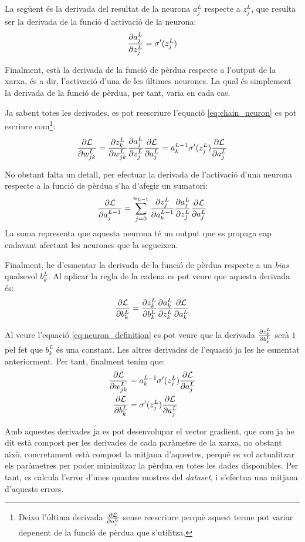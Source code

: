 La següent és la derivada del resultat de la neurona $a_j^L$ respecte a $z_j^L$, que resulta ser la derivada de la funció d'activació de la neurona:
\begin{equation*}
	\pdv{a_j^L}{z_j^L} = \sigma'(z_j^L)
\end{equation*}

Finalment, està la derivada de la funció de pèrdua respecte a l'output de la xarxa, és a dir, l'activació d'una de les últimes neurones. La qual és simplement la derivada de la funció de pèrdua, per tant, varia en cada cas.

Ja sabent totes les derivades, es pot reescriure l'equació \ref{eq:chain_neuron} es pot escriure com\footnote{Deixo l'última derivada $\pdv{\mathcal{L}}{a_j^L}$ sense reescriure perquè aquest terme pot variar depenent de la funció de pèrdua que s'utilitza.}:
$$
	\pdv{\mathcal{L}}{w_{jk}^L} = \pdv{z_k^L}{w_{jk}^L}\pdv{a_j^L}{z_j^L}\pdv{\mathcal{L}}{a_j^L} = 
	a^{L-1}_k \sigma'(z_j^L)\pdv{\mathcal{L}}{a_j^L}
$$

No obstant falta un detall, per efectuar la derivada de l'activació d'una neurona respecte a la funció de pèrdua s'ha d'afegir un sumatori:
$$
\pdv{\mathcal{L}}{a_j^{L-1}} = \sum_{j=0}^{n_{L-1}} \pdv{z_j^L}{a_k^{L-1}}\pdv{a_j^L}{z_j^L}\pdv{\mathcal{L}}{a_j^L}
$$
La suma representa que aquesta neurona té un output que es propaga cap endavant afectant les neurones que la segueixen.

Finalment, he d'esmentar la derivada de la funció de pèrdua respecte a un \textit{bias} qualsevol $ b^L_k$. Al aplicar la regla de la cadena es pot veure que aquesta derivada és:
\begin{equation*}
	\pdv{\mathcal{L}}{b^L_k} = \pdv{z^L_{k}}{b^L_{k}}\pdv{a^L_{k}}{z^L_{k}}\pdv{\mathcal{L}}{a^L_{k}}
\end{equation*}

Al veure l'equació \ref{eq:neuron_definition} es pot veure que la derivada $ \pdv{z^{L}_{k}}{b^{L}_{k}}$ serà $1$ pel fet que $ b^{L}_{k}$ és una constant. Les altres derivades de l'equació ja les he esmentat anteriorment. Per tant, finalment tenim que:
\begin{align*}
	\pdv{\mathcal{L}}{w_{jk}^L} &= a^{L-1}_k \sigma'(z_j^L)\pdv{\mathcal{L}}{a_j^L} \\
	\pdv{\mathcal{L}}{b^L_k} &= \sigma'(z_j^L)\pdv{\mathcal{L}}{a_j^L}
\end{align*}

Amb aquestes derivades ja es pot desenvolupar el vector gradient, que com ja he dit està compost per les derivades de cada paràmetre de la xarxa, no obstant això, concretament està compost la mitjana d'aquestes, perquè es vol actualitzar els paràmetres per poder minimitzar la pèrdua en totes les dades disponibles. Per tant, es calcula l'error d'unes quantes mostres del \textit{dataset}, i s'efectua una mitjana d'aquests errors.

